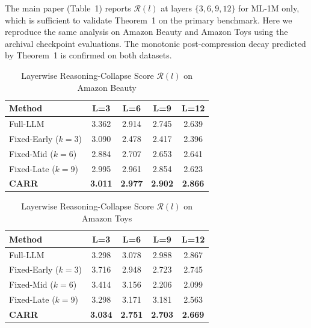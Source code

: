 \documentclass[letterpaper,10pt]{article}
\begin{document}
The main paper (Table~1) reports $\mathcal{R}(l)$ at layers $\{3,6,9,12\}$ for ML-1M only, which is sufficient to validate Theorem~1 on the primary benchmark. Here we reproduce the same analysis on Amazon Beauty and Amazon Toys using the archival checkpoint evaluations. The monotonic post-compression decay predicted by Theorem~1 is confirmed on both datasets.

\begin{table}[h!]
\centering
\caption{Layerwise Reasoning-Collapse Score $\mathcal{R}(l)$ on Amazon Beauty\label{tab:supp-beauty-R}}
\begin{tabular}{l|cccc}
\toprule
\textbf{Method} & \textbf{L=3} & \textbf{L=6} & \textbf{L=9} & \textbf{L=12} \\
\midrule
Full-LLM        & 3.362 & 2.914 & 2.745 & 2.639 \\
Fixed-Early ($k=3$) & 3.090 & 2.478 & 2.417 & 2.396 \\
Fixed-Mid ($k=6$)   & 2.884 & 2.707 & 2.653 & 2.641 \\
Fixed-Late ($k=9$)  & 2.995 & 2.961 & 2.854 & 2.623 \\
\textbf{CARR}   & \textbf{3.011} & \textbf{2.977} & \textbf{2.902} & \textbf{2.866} \\
\bottomrule
\end{tabular}
\end{table}

\begin{table}[h!]
\centering
\caption{Layerwise Reasoning-Collapse Score $\mathcal{R}(l)$ on Amazon Toys\label{tab:supp-toys-R}}
\begin{tabular}{l|cccc}
\toprule
\textbf{Method} & \textbf{L=3} & \textbf{L=6} & \textbf{L=9} & \textbf{L=12} \\
\midrule
Full-LLM        & 3.298 & 3.078 & 2.988 & 2.867 \\
Fixed-Early ($k=3$) & 3.716 & 2.948 & 2.723 & 2.745 \\
Fixed-Mid ($k=6$)   & 3.414 & 3.156 & 2.206 & 2.099 \\
Fixed-Late ($k=9$)  & 3.298 & 3.171 & 3.181 & 2.563 \\
\textbf{CARR}   & \textbf{3.034} & \textbf{2.751} & \textbf{2.703} & \textbf{2.669} \\
\bottomrule
\end{tabular}
\end{table}
\end{document}
